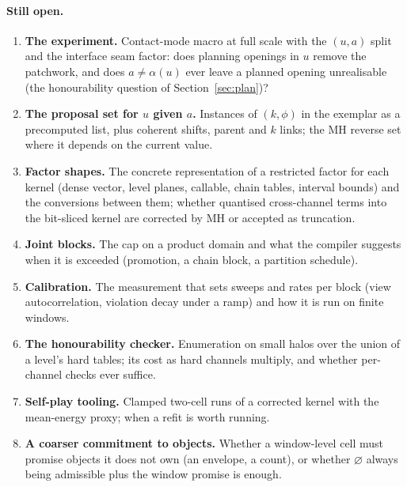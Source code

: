 \documentclass[11pt]{article}
\newcommand{\1}{\mathds{1}}
\begin{document}
\paragraph{Still open.}
\begin{enumerate}
  \item \textbf{The experiment.} Contact-mode macro at full scale with the
        $(u, a)$ split and the interface seam factor: does planning openings in
        $u$ remove the patchwork, and does $a \ne \alpha(u)$ ever leave a planned
        opening unrealisable (the honourability question of Section~\ref{sec:plan})?
  \item \textbf{The proposal set for $u$ given $a$.} Instances of $(k, \phi)$ in
        the exemplar as a precomputed list, plus coherent shifts, parent and $k$
        links; the MH reverse set where it depends on the current value.
  \item \textbf{Factor shapes.} The concrete representation of a restricted
        factor for each kernel (dense vector, level planes, callable, chain
        tables, interval bounds) and the conversions between them; whether
        quantised cross-channel terms into the bit-sliced kernel are corrected
        by MH or accepted as truncation.
  \item \textbf{Joint blocks.} The cap on a product domain and what the compiler
        suggests when it is exceeded (promotion, a chain block, a partition
        schedule).
  \item \textbf{Calibration.} The measurement that sets sweeps and rates per
        block (view autocorrelation, violation decay under a ramp) and how it is
        run on finite windows.
  \item \textbf{The honourability checker.} Enumeration on small halos over the
        union of a level's hard tables; its cost as hard channels multiply, and
        whether per-channel checks ever suffice.
  \item \textbf{Self-play tooling.} Clamped two-cell runs of a corrected kernel
        with the mean-energy proxy; when a refit is worth running.
  \item \textbf{A coarser commitment to objects.} Whether a window-level cell
        must promise objects it does not own (an envelope, a count), or whether
        $\varnothing$ always being admissible plus the window promise is enough.
\end{enumerate}
\end{document}
